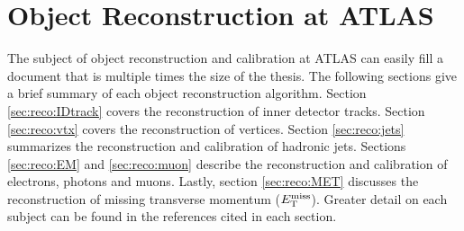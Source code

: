\chapter{Object Reconstruction at ATLAS}
\label{chap:reconstruction}

\indent The subject of object reconstruction and calibration at ATLAS can easily fill a document that is multiple times the size of the thesis.  The following sections give a brief summary of each object reconstruction algorithm.  Section \ref{sec:reco:IDtrack} covers the reconstruction of inner detector tracks.  Section \ref{sec:reco:vtx} covers the reconstruction of vertices. Section \ref{sec:reco:jets} summarizes the reconstruction and calibration of hadronic jets.  Sections \ref{sec:reco:EM} and \ref{sec:reco:muon} describe the reconstruction and calibration of electrons, photons and muons.  Lastly, section \ref{sec:reco:MET} discusses the reconstruction of missing transverse momentum ($E_{\mathrm{T}}^{\mathrm{miss}}$). Greater detail on each subject can be found in the references cited in each section.











